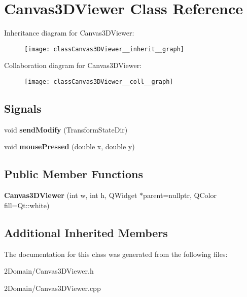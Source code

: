 \hypertarget{classCanvas3DViewer}{}\section{Canvas3\+D\+Viewer Class Reference}
\label{classCanvas3DViewer}


Inheritance diagram for Canvas3\+D\+Viewer\+:
\nopagebreak
\begin{figure}[H]
\begin{center}
\leavevmode
\texttt{[image: classCanvas3DViewer\_\_inherit\_\_graph]}
\end{center}
\end{figure}


Collaboration diagram for Canvas3\+D\+Viewer\+:
\nopagebreak
\begin{figure}[H]
\begin{center}
\leavevmode
\texttt{[image: classCanvas3DViewer\_\_coll\_\_graph]}
\end{center}
\end{figure}
\subsection*{Signals}
\begin{DoxyCompactItemize}
\item 
\mbox{\label{classCanvas3DViewer_a4c258056abebb75a2fc2fa5e051ef9e0}} 
void {\bfseries send\+Modify} (Transform\+State\+Dir)
\item 
\mbox{\label{classCanvas3DViewer_ae9e44799d65879904bc4d55801b97281}} 
void {\bfseries mouse\+Pressed} (double x, double y)
\end{DoxyCompactItemize}
\subsection*{Public Member Functions}
\begin{DoxyCompactItemize}
\item 
\mbox{\label{classCanvas3DViewer_af8298dc7311d1ff6fc051adb683f7ea1}} 
{\bfseries Canvas3\+D\+Viewer} (int w, int h, Q\+Widget $\ast$parent=nullptr, Q\+Color fill=Qt\+::white)
\end{DoxyCompactItemize}
\subsection*{Additional Inherited Members}


The documentation for this class was generated from the following files\+:\begin{DoxyCompactItemize}
\item 
2\+Domain/Canvas3\+D\+Viewer.\+h\item 
2\+Domain/Canvas3\+D\+Viewer.\+cpp\end{DoxyCompactItemize}
